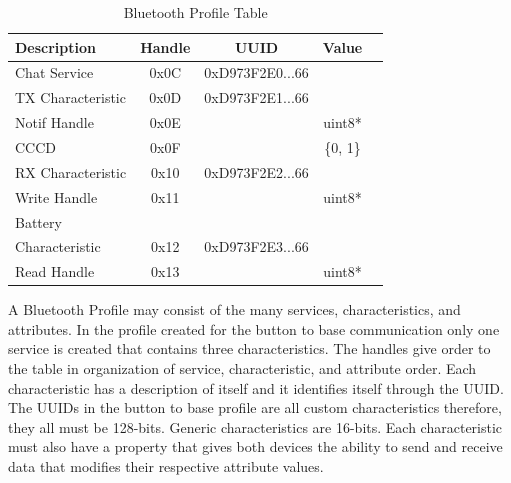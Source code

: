 \documentclass[journal,compsoc]{IEEEtran}
\begin{document}
\begin{table}[H]
\centering
\caption{Bluetooth Profile Table}
  \begin{tabular}{|l|c|c|c|c|}
      \hline
      Description         &Handle& UUID              & Value\\
      \hline
      Chat Service 	      & 0x0C & 0xD973F2E0...66   & \\
      \hline
      TX Characteristic   & 0x0D & 0xD973F2E1...66   & \\
      \hline
      Notif Handle	      & 0x0E & 				     & uint8*\\
      \hline
      CCCD                & 0x0F & 			         & \{0, 1\}\\
      \hline
      RX Characteristic   & 0x10 & 0xD973F2E2...66   & \\
      \hline
      Write Handle		  & 0x11 &					 & uint8*\\
      \hline
      Battery 		      &		 &					 & \\
      Characteristic	  & 0x12 & 0xD973F2E3...66   & \\
      \hline
      Read Handle		  & 0x13 & 					 & uint8*\\
      \hline
  \end{tabular}
  \label{BT Access}
\end{table}
A Bluetooth Profile may consist of the many services, characteristics, and attributes. In the profile created for the button to base communication only one service is created that contains three characteristics.  The handles give order to the table in organization of service, characteristic, and attribute order. Each characteristic has a description of itself and it identifies itself through the UUID. The UUIDs in the button to base profile are all custom characteristics therefore, they all must be 128-bits.  Generic characteristics are 16-bits. Each characteristic must also have a property that gives both devices the ability to send and receive data that modifies their respective attribute values.\\
\end{document}
